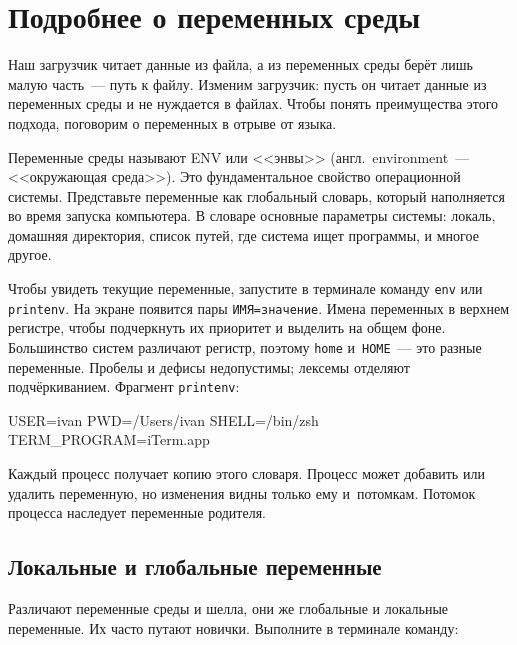\section{Подробнее о переменных среды}


Наш загрузчик читает данные из файла, а из переменных среды берёт лишь малую
часть~--- путь к файлу. Изменим загрузчик: пусть он читает данные из переменных
среды и не нуждается в файлах. Чтобы понять преимущества этого подхода,
поговорим о переменных в отрыве от языка.

Переменные среды называют ENV или <<энвы>> (англ.~envi\-ron\-ment~--- <<окружающая
среда>>). Это фундаментальное свойство операционной системы. Представьте
переменные как глобальный словарь, который наполняется во время запуска
компьютера. В словаре основные параметры системы: локаль, домашняя директория,
список путей, где система ищет программы, и многое другое.


Чтобы увидеть текущие переменные, запустите в терминале команду \verb|env| или
\verb|printenv|. На экране появится пары \verb|ИМЯ=значение|. Имена переменных в
верхнем регистре, чтобы подчеркнуть их приоритет и выделить на общем
фоне. Большинство систем различают регистр, поэтому \verb|home|
и~\verb|HOME|~--- это разные переменные. Пробелы и дефисы недопустимы; лексемы
отделяют подчёркиванием. Фрагмент \verb|printenv|:

\begin{english}
  \begin{bash}
USER=ivan
PWD=/Users/ivan
SHELL=/bin/zsh
TERM_PROGRAM=iTerm.app
  \end{bash}
\end{english}

Каждый процесс получает копию этого словаря. Процесс может добавить или удалить
переменную, но изменения видны только ему и~потомкам. Потомок процесса наследует
переменные родителя.

\subsection{Локальные и глобальные переменные}


Различают переменные среды и шелла, они же глобальные и локальные переменные. Их
часто путают новички. Выполните в терминале команду:

